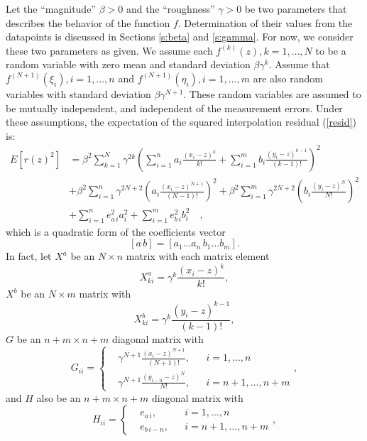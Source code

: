 Let the ``magnitude'' $\beta > 0$ and the ``roughness'' $\gamma > 0$ be two
parameters that describes the behavior of the function $f$.  Determination
of their values from the datapoints is discussed in Sections
\ref{s:beta} and \ref{s:gamma}.
For now, we consider these two parameters as given.  We assume each
$f^{(k)}(z), k=1,\ldots,N$ to be a random variable with zero mean and
standard deviation $\beta \gamma^k$.  Assume that
$f^{(N+1)}(\xi_i), i=1,\ldots,n$ and $f^{(N+1)}(\eta_i), i=1,\ldots,m$ are
also random variables with standard deviation $\beta \gamma^{N+1}$.  These
random variables are assumed to be mutually independent, and independent
of the measurement errors.  Under these assumptions, the expectation of the
squared interpolation residual (\ref{resid}) is:
\begin{equation} \begin{split} \label{quadform}
  E\left[r(z)^2\right] &= \beta^2 \sum_{k=1}^N \gamma^{2k}
         \left(\sum_{i=1}^n a_i \frac{(x_i - z)^k}{k!} +
               \sum_{i=1}^m b_i \frac{(y_i - z)^{k-1}}{(k-1)!}\right)^2 \\
      &+ \beta^2 \sum_{i=1}^n \gamma^{2N+2}
                      \left(a_i \frac{(x_i - z)^{N+1}}{(N-1)!}\right)^2
       + \beta^2 \sum_{i=1}^m \gamma^{2N+2}
                      \left(b_i \frac{(y_i - z)^N}{N!}\right)^2 \\
      &+ \sum_{i=1}^n e_{a\,i}^2 a_i^2 + \sum_{i=1}^m e_{b\,i}^2 b_i^2 \quad,
\end{split} \end{equation}
which is a quadratic form of the coefficients vector
\[[a\,b] = [a_1\ldots a_n\,b_1 \ldots b_m].\]
In fact, let $X^a$ be an $N \times n$ matrix with each matrix element
\[ X^a_{ki} = \gamma^k \frac{(x_i - z)^k}{k!}, \]
$X^b$ be an $N \times m$ matrix with
\[ X^b_{ki} = \gamma^k \frac{(y_i - z)^{k-1}}{(k-1)!}, \]
$G$ be an $n+m \times n+m$ diagonal matrix with
\[ G_{ii} = \left\{ \begin{aligned}
      & \gamma^{N+1} \frac{(x_i - z)^{N+1}}{(N+1)!}, && i=1,\ldots,n \\
      & \gamma^{N+1} \frac{(y_{i-n} - z)^N}{N!}, && i=n+1,\ldots,n+m
      \end{aligned} \right. , \]
and $H$ also be an $n+m \times n+m$ diagonal matrix with
\[ H_{ii} = \left\{ \begin{aligned}
      & e_{a\,i}, && i=1,\ldots,n \\
      & e_{b\,i-n}, && i=n+1,\ldots,n+m \end{aligned} \right. , \]
